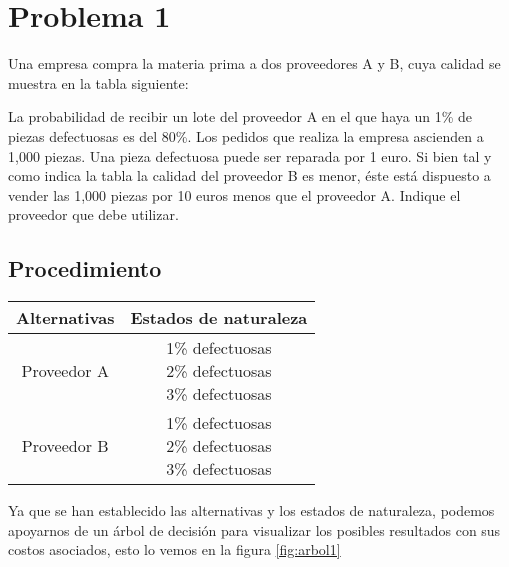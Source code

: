 \documentclass{article}
\begin{document}
    \section{Problema 1}

        Una empresa compra la materia prima a dos proveedores A y B, cuya calidad se muestra en la tabla siguiente:

        La probabilidad de recibir un lote del proveedor A en el que haya un 1\% de piezas defectuosas es del 80\%. Los pedidos que realiza la empresa ascienden a 1,000 piezas. Una pieza defectuosa puede ser reparada por 1 euro. Si bien tal y como indica la tabla la calidad del proveedor B es menor, éste está dispuesto a vender las 1,000 piezas por 10 euros menos que el proveedor A. Indique el proveedor que debe utilizar.

        \subsection{Procedimiento}

            \begin{table}[h!]
                \centering
                \begin{tabular}{ ||c|c|| }
                    \hline
                    Alternativas & Estados de naturaleza \\
                    \hline
                    Proveedor A & \shortstack{1\% defectuosas \\ 2\% defectuosas \\ 3\% defectuosas} \\
                    \hline
                    Proveedor B & \shortstack{1\% defectuosas \\ 2\% defectuosas \\ 3\% defectuosas} \\
                    \hline
                \end{tabular}
            \end{table}

            Ya que se han establecido las alternativas y los estados de naturaleza, podemos apoyarnos de un árbol de decisión para visualizar los posibles resultados con sus costos asociados, esto lo vemos en la figura \ref{fig:arbol1}

\end{document}
